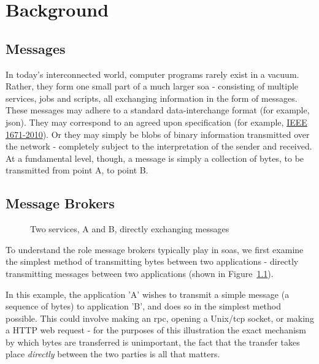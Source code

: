 \chapter{Background}
\label{chap:Background}

\section{Messages}
\label{sec:Messages}

In today's interconnected world, computer programs rarely exist in a vacuum.
Rather, they form one small part of a much larger \gls{soa} -
consisting of multiple services, jobs and scripts, all exchanging information in
the form of messages. These messages may adhere to a standard data-interchange
format (for example, \gls{json}). They may correspond to an agreed upon
specification (for example, \href{https://goo.gl/rjuP4C}{IEEE 1671-2010}).
Or they may simply be blobs of binary information transmitted over the network -
completely subject to the interpretation of the sender and received.
At a fundamental level, though, a message is simply a collection of bytes, to be
transmitted from point A, to point B.

\section{Message Brokers}
\label{sec:brokers}

\begin{figure}[ht]
  \centering
  
  \caption{Two services, A and B, directly exchanging messages}
  \label{fig:tikz:directMessaging}
\end{figure}

To understand the role message brokers typically play in \glspl{soa}, we first
examine the simplest method of transmitting bytes between two applications -
directly transmitting messages between two applications (shown in
Figure~\ref{fig:tikz:directMessaging}).

In this example, the application 'A' wishes to transmit a simple message (a
sequence of bytes) to application 'B', and does so in the simplest method
possible. This could involve making an \gls{rpc}, opening a Unix/\gls{tcp}
socket, or making a HTTP web request - for the purposes of this illustration the
exact mechanism by which bytes are transferred is unimportant, the fact that the
transfer takes place \emph{directly} between the two parties is all that
matters.

